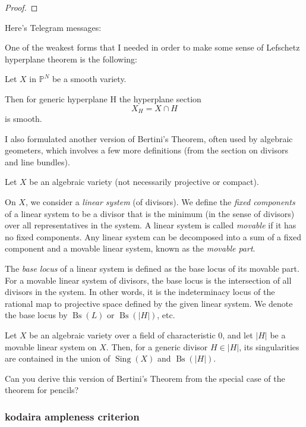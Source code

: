 \begin{proof}\leavevmode

\end{proof}

Here's Telegram messages:

One of the weakest forms that I needed in order to make some sense of Lefschetz hyperplane theorem is the following:

Let \(X\) in \(\mathbb{P}^N\) be a smooth variety.

Then for generic hyperplane H the hyperplane section
\[X_H=X \cap H\]
is smooth.

I also formulated another version of Bertini's Theorem, often used by algebraic geometers, which involves a few more definitions (from the section on divisors and line bundles).

Let \( X \) be an algebraic variety (not necessarily projective or compact).

On \( X \), we consider a \emph{linear system} (of divisors). We define the \emph{fixed components} of a linear system to be a divisor that is the minimum (in the sense of divisors) over all representatives in the system. A linear system is called \emph{movable} if it has no fixed components. Any linear system can be decomposed into a sum of a fixed component and a movable linear system, known as the \emph{movable part}.

The \emph{base locus} of a linear system is defined as the base locus of its movable part. For a movable linear system of divisors, the base locus is the intersection of all divisors in the system. In other words, it is the indeterminacy locus of the rational map to projective space defined by the given linear system. We denote the base locus by \( \operatorname{Bs}(L) \) or \( \operatorname{Bs}(|H|) \), etc.

\begin{thm}[Bertini]
Let \( X \) be an algebraic variety over a field of characteristic 0, and let \( |H| \) be a movable linear system on \( X \). Then, for a generic divisor \( H \in |H| \), its singularities are contained in the union of \( \operatorname{Sing}(X) \) and \( \operatorname{Bs}(|H|) \).
\end{thm}

\begin{exercise}
Can you derive this version of Bertini’s Theorem from the special case of the theorem for pencils?
\end{exercise}

\subsubsection{kodaira ampleness criterion}

